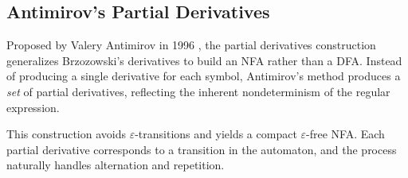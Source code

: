 %
%
%

\subsection{Antimirov's Partial Derivatives}
Proposed by Valery Antimirov in 1996 \cite{pdregex_antimirov}, the partial derivatives construction generalizes Brzozowski's derivatives to build an NFA rather than a DFA. Instead of producing a single derivative for each symbol, Antimirov's method produces a \emph{set} of partial derivatives, reflecting the inherent nondeterminism of the regular expression.

This construction avoids $\varepsilon$-transitions and yields a compact $\varepsilon$-free NFA. Each partial derivative corresponds to a transition in the automaton, and the process naturally handles alternation and repetition.



